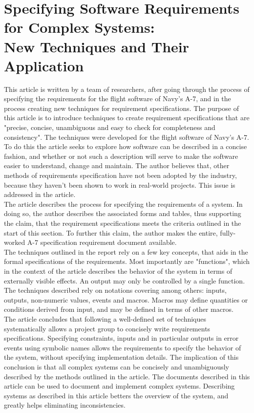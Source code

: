 \documentclass[Main]{subfiles}
\begin{document}
\section{Specifying Software Requirements for Complex Systems: \\
New Techniques and Their Application \cite{Specifying}}
This article is written by a team of researchers, after going through the process of specifying the requirements for the flight software of Navy's A-7, and in the process creating new techniques for requirement specifications.
The purpose of this article is to introduce techniques to create requirement specifications that are "precise, concise, unambiguous and easy to check for completeness and consistency"\cite{Specifying}. The techniques were developed for the flight software of Navy's A-7. 
To do this the article seeks to explore how software can be described in a concise fashion, and whether or not such a description will serve to make the software easier to understand, change and maintain. The author believes that, other methods of requirements specification have not been adopted by the industry, because they haven't been shown to work in real-world projects. This issue is addressed in the article. 
\\ %
The article describes the process for specifying the requirements of a system. In doing so, the author describes the associated forms and tables, thus supporting the claim, that the requirement specifications meets the criteria outlined in the start of this section. To further this claim, the author makes the entire, fully-worked A-7 specification requirement document available.
\\%
The techniques outlined in the report rely on a few key concepts, that aids in the formal specifications of the requirements. Most importantly are "functions", which in the context of the article describes the behavior of the system in terms of externally visible effects. An output may only be controlled by a single function. The techniques described rely on notations covering among others: inputs, outputs, non-numeric values, events and macros. Macros may define quantities or conditions derived from input, and may be defined in terms of other macros.
\\
The article concludes that following a well-defined set of techniques systematically allows a project group to concisely write requirements specifications. Specifying constraints, inputs and in particular outputs in error events using symbolic names allows the requirements to specify the behavior of the system, without specifying implementation details. 
The implication of this conclusion is that all complex systems can be concisely and unambiguously described by the methods outlined in the article. The documents described in this article can be used to document and implement complex systems. Describing systems as described in this article betters the overview of the system, and greatly helps eliminating inconsistencies.
		
\end{document}

